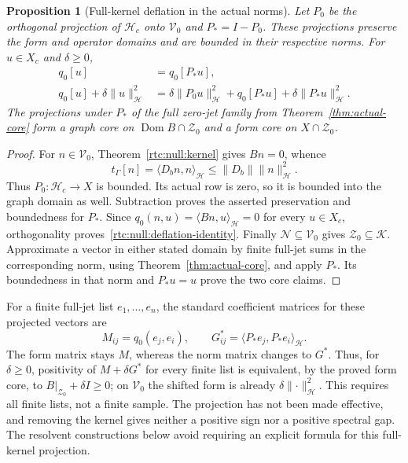 \documentclass[11pt,a4paper]{article}
\numberwithin{equation}{section}
\newtheorem{proposition}[theorem]{Proposition}
\theoremstyle{definition}\newtheorem{definition}[theorem]{Definition}
\theoremstyle{remark}\newtheorem{remark}[theorem]{Remark}
\newcommand{\Hh}{\mathcal H}\newcommand{\Hw}{\mathcal H}
\newcommand{\tg}{t_\Gamma}\newcommand{\cg}{c_\Gamma}
\newcommand{\ip}[2]{\langle#1,#2\rangle}\newcommand{\norm}[1]{\lVert#1\rVert}\newcommand{\abs}[1]{\lvert#1\rvert}
\begin{document}
\begin{proposition}[Full-kernel deflation in the actual norms]\label{rtc:null:deflation}
Let $P_0$ be the orthogonal projection of $\Hh_c$ onto $\mathcal V_0$
and $P_*=I-P_0$.  These projections preserve the form and operator
domains and are bounded in their respective norms.  For $u\in X_c$
and $\delta\ge0$,
\begin{equation}\label{rtc:null:deflation-identity}
 \begin{split}
 q_0[u]&=q_0[P_*u],\\
 q_0[u]+\delta\norm{u}_{\Hh}^2
 &=\delta\norm{P_0u}_{\Hh}^2+
   q_0[P_*u]+\delta\norm{P_*u}_{\Hh}^2.
 \end{split}
\end{equation}
The projections under $P_*$ of the full zero-jet family from
Theorem~\ref{thm:actual-core} form a graph core on
$\operatorname{Dom}B\cap\mathcal Z_0$ and a form core on
$X\cap\mathcal Z_0$.
\end{proposition}
\begin{proof}
For $n\in\mathcal V_0$, Theorem~\ref{rtc:null:kernel} gives $Bn=0$,
whence
\[
 \tg[n]=\ip{D_bn}{n}_{\Hh}\le\norm{D_b}\norm{n}_{\Hh}^2.
\]
Thus $P_0:\Hh_c\to X$ is bounded.  Its actual row is zero, so it is
bounded into the graph domain as well.  Subtraction proves the asserted
preservation and boundedness for $P_*$.  Since
$q_0(n,u)=\ip{Bn}{u}_{\Hh}=0$ for every $u\in X_c$, orthogonality
proves~\eqref{rtc:null:deflation-identity}.
Finally $\mathcal N\subseteq\mathcal V_0$ gives
$\mathcal Z_0\subseteq\mathcal K$.
Approximate a vector in either stated domain by finite full-jet sums in
the corresponding norm, using Theorem~\ref{thm:actual-core}, and apply
$P_*$.  Its boundedness in that norm and $P_*u=u$ prove the two core
claims.
\end{proof}
For a finite full-jet list $e_1,\ldots,e_n$, the standard coefficient
matrices for these projected vectors are
\[
 M_{ij}=q_0(e_j,e_i),\qquad
 G^*_{ij}=\ip{P_*e_j}{P_*e_i}_{\Hh}.
\]
The form matrix stays $M$, whereas the norm matrix changes to $G^*$.
Thus, for $\delta\ge0$, positivity of $M+\delta G^*$ for every finite
list is equivalent, by the proved form core, to $B|_{\mathcal Z_0}
+\delta I\ge0$; on $\mathcal V_0$ the shifted form is already
$\delta\norm{\cdot}_{\Hh}^2$.
This requires all finite lists, not a finite sample.  The projection has
not been made effective, and removing the kernel gives neither a
positive sign nor a positive spectral gap.  The resolvent constructions
below avoid requiring an explicit formula for this full-kernel
projection.
\end{document}
